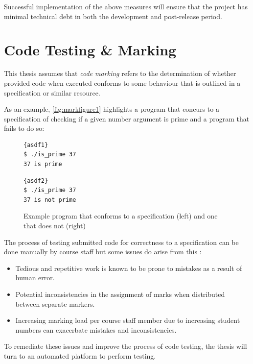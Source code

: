 \documentclass[hidelinks]{report}
\begin{document}
Successful implementation of the above measures will ensure that the project has minimal technical debt in both the development and post-release period.

\section{Code Testing \& Marking}

This thesis assumes that \textit{code marking} refers to the determination of whether provided code when executed conforms to some behaviour that is outlined in a specification or similar resource.

As an example, \autoref{fig:markfigure1} highlights a program that concurs to a specification of checking if a given number argument is prime and a program that fails to do so:

\begin{figure}[h]
	\centering
	\noindent
	\begin{multicols}{2}
		\begin{lstlisting}[linewidth=0.95\linewidth, title=Correct Program, frame=tlrb]{asdf1}
$ ./is_prime 37
37 is prime
		\end{lstlisting}
		\begin{lstlisting}[linewidth=0.95\linewidth, title=Incorrect Program, frame=tlrb]{asdf2}
$ ./is_prime 37
37 is not prime
		\end{lstlisting}
	\end{multicols}
	\caption{Example program that conforms to a specification (left) and one that does not (right)}
	\label{fig:markfigure1}
\end{figure}

The process of testing submitted code for correctness to a specification can be done manually by course staff but some issues do arise from this \cite{ManualProblem}:
\begin{itemize}
	\item Tedious and repetitive work is known to be prone to mistakes as a result of human error.
	\item Potential inconsistencies in the assignment of marks when distributed between separate markers.
	\item Increasing marking load per course staff member due to increasing student numbers can exacerbate mistakes and inconsistencies.
\end{itemize}

To remediate these issues and improve the process of code testing, the thesis will turn to an automated platform to perform testing.
\end{document}
